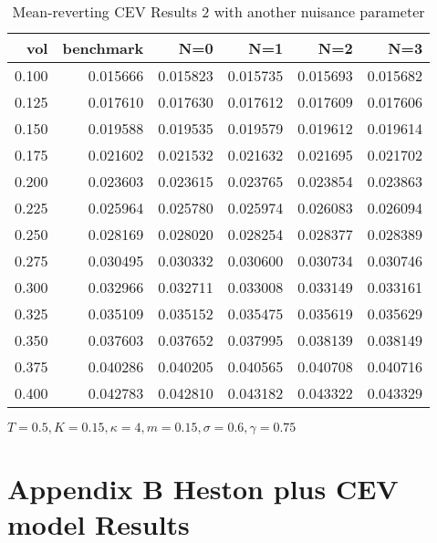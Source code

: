 \begin{table}[ht]
  \centering
  \caption{Mean-reverting CEV Results 2 with another nuisance parameter}
  \begin{tabular}{rrrrrr}
  \toprule
    vol &       benchmark &       N=0 &       N=1 &       N=2 &       N=3 \\
  \midrule
  0.100 & 0.015666 & 0.015823 & 0.015735 & 0.015693 & 0.015682 \\
  0.125 & 0.017610 & 0.017630 & 0.017612 & 0.017609 & 0.017606 \\
  0.150 & 0.019588 & 0.019535 & 0.019579 & 0.019612 & 0.019614 \\
  0.175 & 0.021602 & 0.021532 & 0.021632 & 0.021695 & 0.021702 \\
  0.200 & 0.023603 & 0.023615 & 0.023765 & 0.023854 & 0.023863 \\
  0.225 & 0.025964 & 0.025780 & 0.025974 & 0.026083 & 0.026094 \\
  0.250 & 0.028169 & 0.028020 & 0.028254 & 0.028377 & 0.028389 \\
  0.275 & 0.030495 & 0.030332 & 0.030600 & 0.030734 & 0.030746 \\
  0.300 & 0.032966 & 0.032711 & 0.033008 & 0.033149 & 0.033161 \\
  0.325 & 0.035109 & 0.035152 & 0.035475 & 0.035619 & 0.035629 \\
  0.350 & 0.037603 & 0.037652 & 0.037995 & 0.038139 & 0.038149 \\
  0.375 & 0.040286 & 0.040205 & 0.040565 & 0.040708 & 0.040716 \\
  0.400 & 0.042783 & 0.042810 & 0.043182 & 0.043322 & 0.043329 \\
  \bottomrule
  \end{tabular}
  \small{$T=0.5,K=0.15, \kappa = 4,m=0.15, \sigma = 0.6, \gamma = 0.75$}
\end{table}




\chapter{Appendix B Heston plus CEV model Results}

